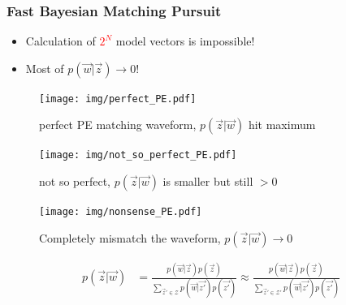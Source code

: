 \documentclass{beamer}
\begin{document}
\begin{frame}
    \frametitle{Fast Bayesian Matching Pursuit}
    \begin{itemize}
        \item Calculation of \textcolor{red}{$2^{N}$} model vectors is impossible!
        \item Most of $p(\vec{w}|\vec{z}) \rightarrow 0$!
    \end{itemize}
    \noindent\begin{minipage}[c]{0.33\textwidth}
        \begin{figure}[H]
            \centering
                \texttt{[image: img/perfect\_PE.pdf]}
            \caption{perfect PE matching waveform, $p(\vec{z}|\vec{w})$ hit maximum}
            \label{fig:perfect PE}
        \end{figure}
    \end{minipage}\begin{minipage}[c]{0.33\textwidth}
        \begin{figure}[H]
            \centering
                \texttt{[image: img/not\_so\_perfect\_PE.pdf]}
            \caption{not so perfect, $p(\vec{z}|\vec{w})$ is smaller but still $>0$}
            \label{fig:not so perfect PE}
        \end{figure}
    \end{minipage}\begin{minipage}[c]{0.33\textwidth}
        \begin{figure}[H]
            \centering
                \texttt{[image: img/nonsense\_PE.pdf]}
            \caption{Completely mismatch the waveform, $p(\vec{z}|\vec{w}) \rightarrow 0$}
            \label{fig:nonsense PE}
        \end{figure}
    \end{minipage}
    \begin{align*}
        p(\vec{z}|\vec{w}) &= \frac{p(\vec{w}|\vec{z})p(\vec{z})}{\sum_{\vec{z}'\in\mathcal{Z}}p(\vec{w}|\vec{z'})p(\vec{z'})} \approx \frac{p(\vec{w}|\vec{z})p(\vec{z})}{\sum_{\vec{z}'\in\mathcal{Z}'}p(\vec{w}|\vec{z'})p(\vec{z'})}
    \end{align*}
\end{frame}
\end{document}
